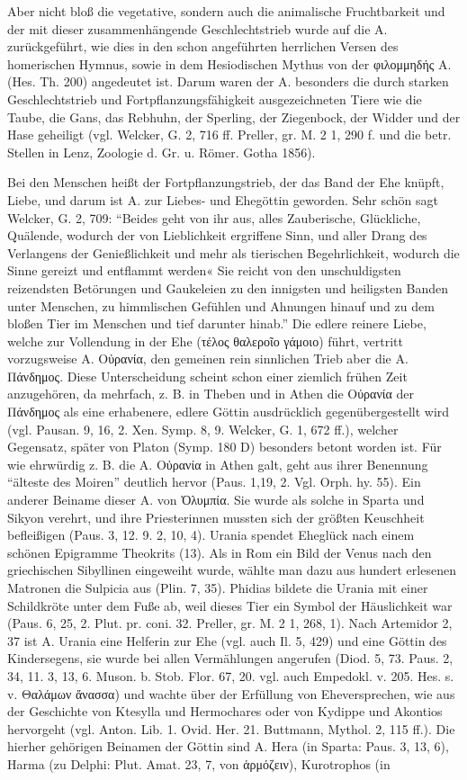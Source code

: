 \documentclass[a4paper, 11pt, oneside]{article}
\begin{document}
Aber nicht bloß die vegetative, sondern auch die animalische Fruchtbarkeit und der mit dieser zusammenhängende Geschlechtstrieb wurde auf die A. zurückgeführt, wie dies in den schon angeführten herrlichen Versen des homerischen Hymnus, sowie in dem Hesiodischen Mythus von der φιλομμηδής A. (Hes. Th. 200) angedeutet ist. Darum waren der A. besonders die durch starken Geschlechtstrieb und Fortpflanzungsfähigkeit ausgezeichneten Tiere wie die Taube, die Gans, das Rebhuhn, der Sperling, der Ziegenbock, der Widder und der Hase geheiligt (vgl. Welcker, G. 2, 716 ff. Preller, gr. M. 2 1, 290 f. und die betr. Stellen in Lenz, Zoologie d. Gr. u. Römer. Gotha 1856).

Bei den Menschen heißt der Fortpflanzungstrieb, der das Band der Ehe knüpft, Liebe, und darum ist A. zur Liebes- und Ehegöttin geworden. Sehr schön sagt Welcker, G. 2, 709: "`Beides geht von ihr aus, alles Zauberische, Glückliche, Quälende, wodurch der von Lieblichkeit ergriffene Sinn, und aller Drang des Verlangens der Genießlichkeit und mehr als tierischen Begehrlichkeit, wodurch die Sinne gereizt und entflammt werden« Sie reicht von den unschuldigsten reizendsten Betörungen und Gaukeleien zu den innigsten und heiligsten Banden unter Menschen, zu himmlischen Gefühlen und Ahnungen hinauf und zu dem bloßen Tier im Menschen und tief darunter hinab."' Die edlere reinere Liebe, welche zur Vollendung in der Ehe (τέλος θαλεροῖο γάμοιο) führt, vertritt vorzugsweise A. Οὐρανία, den gemeinen rein sinnlichen Trieb aber die A. Πάνδημος. Diese Unterscheidung scheint schon einer ziemlich frühen Zeit anzugehören, da mehrfach, z. B. in Theben und in Athen die Οὐρανία der Πάνδημος als eine erhabenere, edlere Göttin ausdrücklich gegenübergestellt wird (vgl. Pausan. 9, 16, 2. Xen. Symp. 8, 9. Welcker, G. 1, 672 ff.), welcher Gegensatz, später von Platon (Symp. 180 D) besonders betont worden ist. Für wie ehrwürdig z. B. die A. Οὐρανία in Athen galt, geht aus ihrer Benennung "`älteste des Moiren"' deutlich hervor (Paus. 1,19, 2. Vgl. Orph. hy. 55). Ein anderer Beiname dieser A. von Ὀλυμπία. Sie wurde als solche in Sparta und Sikyon verehrt, und ihre Priesterinnen mussten sich der größten Keuschheit befleißigen (Paus. 3, 12. 9. 2, 10, 4). Urania spendet Eheglück nach einem schönen Epigramme Theokrits (13). Als in Rom ein Bild der Venus nach den griechischen Sibyllinen eingeweiht wurde, wählte man dazu aus hundert erlesenen Matronen die Sulpicia aus (Plin. 7, 35). Phidias bildete die Urania mit einer Schildkröte unter dem Fuße ab, weil dieses Tier ein Symbol der Häuslichkeit war (Paus. 6, 25, 2. Plut. pr. coni. 32. Preller, gr. M. 2 1, 268, 1). Nach Artemidor 2, 37 ist A. Urania eine Helferin zur Ehe (vgl. auch Il. 5, 429) und eine Göttin des Kindersegens, sie wurde bei allen Vermählungen angerufen (Diod. 5, 73. Paus. 2, 34, 11. 3, 13, 6. Muson. b. Stob. Flor. 67, 20. vgl. auch Empedokl. v. 205. Hes. s. v. Θαλάμων ἄνασσα) und wachte über der Erfüllung von Eheversprechen, wie aus der Geschichte von Ktesylla und Hermochares oder von Kydippe und Akontios hervorgeht (vgl. Anton. Lib. 1. Ovid. Her. 21. Buttmann, Mythol. 2, 115 ff.). Die hierher gehörigen Beinamen der Göttin sind A. Hera (in Sparta: Paus. 3, 13, 6), Harma (zu Delphi: Plut. Amat. 23, 7, von ἁρμόζειν), Kurotrophos (in 
\end{document}
